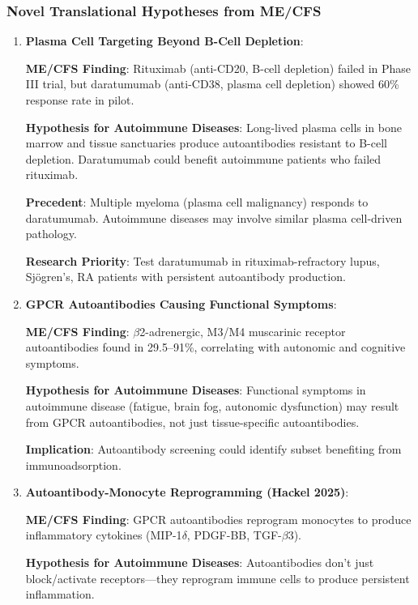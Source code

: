 \subsubsection{Novel Translational Hypotheses from ME/CFS}

\begin{enumerate}
    \item \textbf{Plasma Cell Targeting Beyond B-Cell Depletion}:

    \textbf{ME/CFS Finding}: Rituximab (anti-CD20, B-cell depletion) failed in Phase III trial, but daratumumab (anti-CD38, plasma cell depletion) showed 60\% response rate in pilot.

    \textbf{Hypothesis for Autoimmune Diseases}: Long-lived plasma cells in bone marrow and tissue sanctuaries produce autoantibodies resistant to B-cell depletion. Daratumumab could benefit autoimmune patients who failed rituximab.

    \textbf{Precedent}: Multiple myeloma (plasma cell malignancy) responds to daratumumab. Autoimmune diseases may involve similar plasma cell-driven pathology.

    \textbf{Research Priority}: Test daratumumab in rituximab-refractory lupus, Sjögren's, RA patients with persistent autoantibody production.

    \item \textbf{GPCR Autoantibodies Causing Functional Symptoms}:

    \textbf{ME/CFS Finding}: $\beta$2-adrenergic, M3/M4 muscarinic receptor autoantibodies found in 29.5--91\%, correlating with autonomic and cognitive symptoms.

    \textbf{Hypothesis for Autoimmune Diseases}: Functional symptoms in autoimmune disease (fatigue, brain fog, autonomic dysfunction) may result from GPCR autoantibodies, not just tissue-specific autoantibodies.

    \textbf{Implication}: Autoantibody screening could identify subset benefiting from immunoadsorption.

    \item \textbf{Autoantibody-Monocyte Reprogramming (Hackel 2025)}:

    \textbf{ME/CFS Finding}: GPCR autoantibodies reprogram monocytes to produce inflammatory cytokines (MIP-1$\delta$, PDGF-BB, TGF-$\beta$3).

    \textbf{Hypothesis for Autoimmune Diseases}: Autoantibodies don't just block/activate receptors---they reprogram immune cells to produce persistent inflammation.


\end{enumerate}
